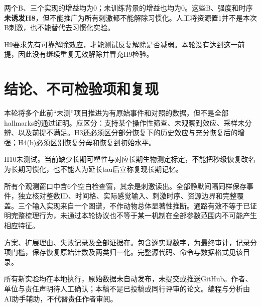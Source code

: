 \documentclass[UTF8,a4paper,zihao=-4,fontset=none]{ctexart}
\begin{document}
两个B、三个实现的增益均为0；未训练背景的增益也均为0。这些B、强度和时序\textbf{未诱发H8}，但不能推广为所有刺激都不能解除习惯化。人工将资源置1并不是本次B刺激，也不能替代去习惯化实验。

H9要求先有可靠解除效应，才能测试反复解除是否减弱。本轮没有达到这一前提，因此没有继续重复无效解除并冒充H9检验。
\FloatBarrier

\section{结论、不可检验项和复现}
本轮将多个此前“未测”项目推进为有原始事件和对照的数据，但不是全部hallmarks的通过证明。应区分：支持某个操作性筛查、未观察到效应、采样未分辨、以及前提不满足。H3还必须区分部分恢复下的历史效应与充分恢复后的增强；H4(b)必须区别恢复分母和恢复到初始水平。

H10未测试。当前缺少长期可塑性与对应长期生物测定标定，不能把秒级恢复改名为长期习惯化，也不能人为延长tau后宣称复现长期记忆。

所有\Windows{}个观测窗口中含6个空白检查窗，其余是刺激读出。全部静默间隔同样保存事件，独立核对整数ID、时间格、实际感觉输入、刺激时序、资源边界和完整覆盖。三个输入实现来自一个图谱，不作动物总体显著性推断。通路有效不等于已证明完整梳理行为，未通过本轮协议也不等于某一机制在全部参数范围内不可能产生相应特征。

方案、扩展理由、失败记录及全部证据在。包含逐实现数字，为最终审计，记录分项门槛，保存恢复原始计数及两类归一化。完整源代码、命令与数据格式见该目录。

所有新实验均在本地执行，原始数据未自动发布，未提交或推送GitHub。作者、单位与责任声明待人工确认；本稿不是已投稿或同行评审的论文。编程与分析由AI助手辅助，不代替责任作者审阅。

{\small}
\end{document}
